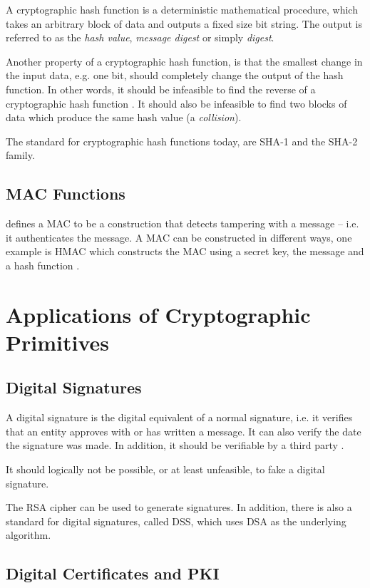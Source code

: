 \documentclass[pdftex,english,10pt,b5paper,twoside]{book}
\begin{document}
A cryptographic hash function is a deterministic mathematical procedure, which
takes an arbitrary block of data and outputs a fixed size bit string. The
output is referred to as the \emph{hash value}, \emph{message digest} or simply
\emph{digest}.

Another property of a cryptographic hash function, is that the
smallest change in the input data, e.g. one bit, should completely change the
output of the hash function. In other words, it should be infeasible to find the
reverse of a cryptographic hash function \cite[p. 335]{stallings}. It should
also be infeasible to find two blocks of data which produce the same hash value
(a \emph{collision}).

The standard for cryptographic hash functions today, are \ac{SHA}-1 and the
\ac{SHA}-2 family.

\subsection{MAC Functions} 

\citet{schneier} defines a \ac{MAC} to be a construction that detects tampering
with a message -- i.e. it authenticates the message. A \ac{MAC} can be
constructed in different ways, one example is H\ac{MAC} which constructs the
\ac{MAC} using a secret key, the message and a hash function \cite{rfc2104}. 

\section{Applications of Cryptographic Primitives}

\subsection{Digital Signatures}

A digital signature is the digital equivalent of a normal signature, i.e. it
verifies that an entity approves with or has written a message. It can also
verify the date the signature was made. In addition, it should be verifiable by
a third party \cite[p.  379]{stallings}.

It should logically not be possible, or at least unfeasible, to fake a digital
signature.

The \ac{RSA} cipher can be used to generate signatures. In addition, there is also a
standard for digital signatures, called \ac{DSS}, which uses \ac{DSA} as the
underlying algorithm.

\subsection{Digital Certificates and PKI}
\end{document}
